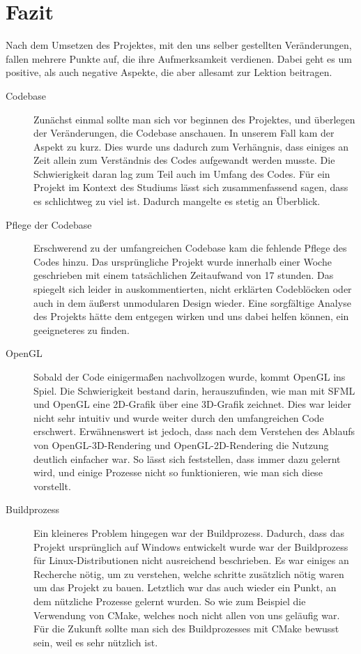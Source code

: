 \documentclass{article}
\begin{document}
\FloatBarrier

\newpage
\section{Fazit}

Nach dem Umsetzen des Projektes, mit den uns selber gestellten Veränderungen, fallen mehrere Punkte auf, die ihre Aufmerksamkeit verdienen. Dabei geht es um positive, als auch negative Aspekte, die aber allesamt zur Lektion beitragen.
\begin{description}
  \item[Codebase] Zunächst einmal sollte man sich vor beginnen des Projektes, und überlegen der Veränderungen, die Codebase anschauen. In unserem Fall kam der Aspekt zu kurz. Dies wurde uns dadurch zum Verhängnis, dass einiges an Zeit allein zum Verständnis des Codes aufgewandt werden musste. Die Schwierigkeit daran lag zum Teil auch im Umfang des Codes. Für ein Projekt im Kontext des Studiums lässt sich zusammenfassend sagen, dass es schlichtweg zu viel ist. Dadurch mangelte es stetig an Überblick.
  \item[Pflege der Codebase] Erschwerend zu der umfangreichen Codebase kam die fehlende Pflege des Codes hinzu. Das ursprüngliche Projekt wurde innerhalb einer Woche geschrieben mit einem tatsächlichen Zeitaufwand von 17 stunden. Das spiegelt sich leider in auskommentierten, nicht erklärten Codeblöcken oder auch in dem äu\ss{}erst unmodularen Design wieder. Eine sorgfältige Analyse des Projekts hätte dem entgegen wirken und uns dabei helfen können, ein geeigneteres zu finden.
  \item[OpenGL] Sobald der Code einigermaßen nachvollzogen wurde, kommt OpenGL ins Spiel. Die Schwierigkeit bestand darin, herauszufinden, wie man mit SFML und OpenGL eine 2D-Grafik über eine 3D-Grafik zeichnet. Dies war leider nicht sehr intuitiv und wurde weiter durch den umfangreichen Code erschwert. Erwähnenswert ist jedoch, dass nach dem Verstehen des Ablaufs von OpenGL-3D-Rendering und OpenGL-2D-Rendering die Nutzung deutlich einfacher war. So lässt sich feststellen, dass immer dazu gelernt wird, und einige Prozesse nicht so funktionieren, wie man sich diese vorstellt.
  \item[Buildprozess] Ein kleineres Problem hingegen war der Buildprozess. Dadurch, dass das Projekt ursprünglich auf Windows entwickelt wurde war der Buildprozess für Linux-Distributionen nicht ausreichend beschrieben. Es war einiges an Recherche nötig, um zu verstehen, welche schritte zusätzlich nötig waren um das Projekt zu bauen. Letztlich war das auch wieder ein Punkt, an dem nützliche Prozesse gelernt wurden. So wie zum Beispiel die Verwendung von CMake, welches noch nicht allen von uns geläufig war. Für die Zukunft sollte man sich des Buildprozesses mit CMake bewusst sein, weil es sehr nützlich ist. 

\end{description}
\end{document}
